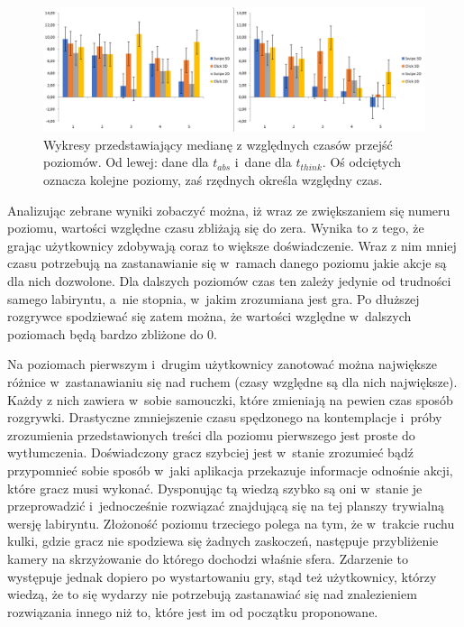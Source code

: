 \documentclass[a4paper,12pt,numbers=noenddot]{report}
\begin{document}
\begin{figure}[h!]
	\centering
  	\includegraphics[width=\linewidth]{diag/rel_median_absThinkTime.png}
	\caption{Wykresy przedstawiający medianę z względnych czasów przejść poziomów. Od lewej: dane dla $t_{abs}$ i~dane dla $t_{think}$. Oś odciętych oznacza kolejne poziomy, zaś rzędnych określa względny czas.}
	\label{fig:diag:rel:median_AbsThinkTime}
\end{figure}

Analizując zebrane wyniki zobaczyć można, iż wraz ze zwiększaniem się numeru poziomu, wartości względne czasu zbliżają się do zera. Wynika to z tego, że grając użytkownicy zdobywają coraz to większe doświadczenie. Wraz z nim mniej czasu potrzebują na zastanawianie się w~ramach danego poziomu jakie akcje są dla nich dozwolone. Dla dalszych poziomów czas ten zależy jedynie od trudności samego labiryntu, a~nie stopnia, w~jakim zrozumiana jest gra. Po dłuższej rozgrywce spodziewać się zatem można, że wartości względne w~dalszych poziomach będą bardzo zbliżone do 0.

Na poziomach pierwszym i~drugim użytkownicy zanotować można największe różnice w~zastanawianiu się nad ruchem (czasy względne są dla nich największe). Każdy z nich zawiera w~sobie samouczki, które zmieniają na pewien czas sposób rozgrywki. Drastyczne zmniejszenie czasu spędzonego na kontemplacje i~próby zrozumienia przedstawionych treści dla poziomu pierwszego jest proste do wytłumczenia. Doświadczony gracz szybciej jest w~stanie zrozumieć bądź przypomnieć sobie sposób w~jaki aplikacja przekazuje informacje odnośnie akcji, które gracz musi wykonać. Dysponując tą wiedzą szybko są oni w~stanie je przeprowadzić i~jednocześnie rozwiązać znajdującą się na tej planszy trywialną wersję labiryntu. Złożoność poziomu trzeciego polega na tym, że w~trakcie ruchu kulki, gdzie gracz nie spodziewa się żadnych zaskoczeń, następuje przybliżenie kamery na skrzyżowanie do którego dochodzi właśnie sfera. Zdarzenie to występuje jednak dopiero po wystartowaniu gry, stąd też użytkownicy, którzy wiedzą, że to się wydarzy nie potrzebują zastanawiać się nad znalezieniem rozwiązania innego niż to, które jest im od początku proponowane.\\
\end{document}
